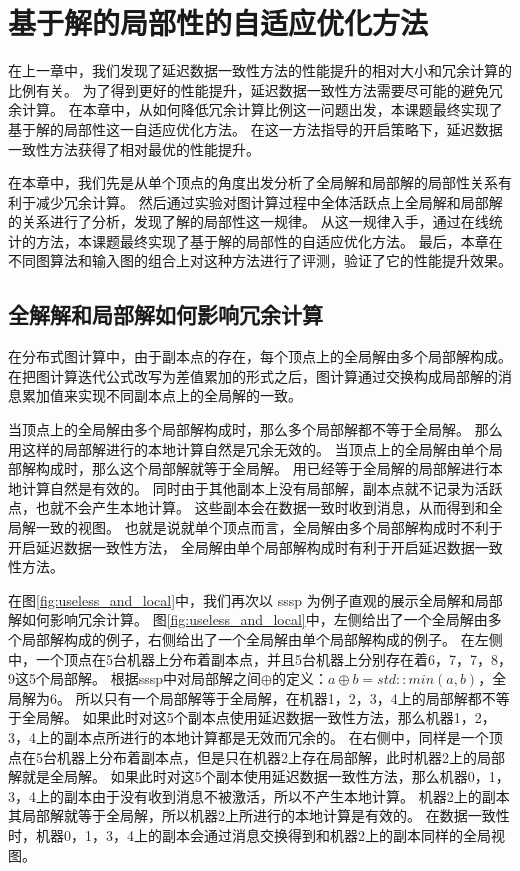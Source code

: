 \chapter{基于解的局部性的自适应优化方法}
在上一章中，我们发现了延迟数据一致性方法的性能提升的相对大小和冗余计算的比例有关。
为了得到更好的性能提升，延迟数据一致性方法需要尽可能的避免冗余计算。
在本章中，从如何降低冗余计算比例这一问题出发，本课题最终实现了基于解的局部性这一自适应优化方法。
在这一方法指导的开启策略下，延迟数据一致性方法获得了相对最优的性能提升。

在本章中，我们先是从单个顶点的角度出发分析了全局解和局部解的局部性关系有利于减少冗余计算。
然后通过实验对图计算过程中全体活跃点上全局解和局部解的关系进行了分析，发现了解的局部性这一规律。
从这一规律入手，通过在线统计的方法，本课题最终实现了基于解的局部性的自适应优化方法。
最后，本章在不同图算法和输入图的组合上对这种方法进行了评测，验证了它的性能提升效果。

\section{全解解和局部解如何影响冗余计算}

在分布式图计算中，由于副本点的存在，每个顶点上的全局解由多个局部解构成。
在把图计算迭代公式改写为差值累加的形式之后，图计算通过交换构成局部解的消息累加值来实现不同副本点上的全局解的一致。

当顶点上的全局解由多个局部解构成时，那么多个局部解都不等于全局解。
那么用这样的局部解进行的本地计算自然是冗余无效的。
当顶点上的全局解由单个局部解构成时，那么这个局部解就等于全局解。
用已经等于全局解的局部解进行本地计算自然是有效的。
同时由于其他副本上没有局部解，副本点就不记录为活跃点，也就不会产生本地计算。
这些副本会在数据一致时收到消息，从而得到和全局解一致的视图。
也就是说就单个顶点而言，全局解由多个局部解构成时不利于开启延迟数据一致性方法，
全局解由单个局部解构成时有利于开启延迟数据一致性方法。


在图\ref{fig:useless_and_local}中，我们再次以 sssp 为例子直观的展示全局解和局部解如何影响冗余计算。
图\ref{fig:useless_and_local}中，左侧给出了一个全局解由多个局部解构成的例子，右侧给出了一个全局解由单个局部解构成的例子。
在左侧中，一个顶点在5台机器上分布着副本点，并且5台机器上分别存在着6，7，7，8，9这5个局部解。
根据sssp中对局部解之间$\oplus$的定义：$a\oplus b=std::min(a,b)$，全局解为6。
所以只有一个局部解等于全局解，在机器1，2，3，4上的局部解都不等于全局解。
如果此时对这5个副本点使用延迟数据一致性方法，那么机器1，2，3，4上的副本点所进行的本地计算都是无效而冗余的。
在右侧中，同样是一个顶点在5台机器上分布着副本点，但是只在机器2上存在局部解，此时机器2上的局部解就是全局解。
如果此时对这5个副本使用延迟数据一致性方法，那么机器0，1，3，4上的副本由于没有收到消息不被激活，所以不产生本地计算。
机器2上的副本其局部解就等于全局解，所以机器2上所进行的本地计算是有效的。
在数据一致性时，机器0，1，3，4上的副本会通过消息交换得到和机器2上的副本同样的全局视图。



